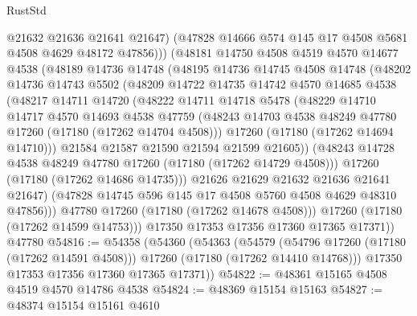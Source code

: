\begin{lexlean}{RustStd}
\begin{coremodule}
                @21632
                @21636
                @21641
                @21647)
              (@47828 @14666 @574 @145 @17 @4508 @5681 @4508 @4629 @48172 @47856)))
          (@48181
            @14750
            @4508
            @4519
            @4570
            @14677
            @4538
            (@48189
              @14736
              @14748
              (@48195
                @14736
                @14745
                @4508
                @14748
                (@48202
                  @14736
                  @14743
                  @5502
                  (@48209
                    @14722
                    @14735
                    @14742
                    @4570
                    @14685
                    @4538
                    (@48217
                      @14711
                      @14720
                      (@48222
                        @14711
                        @14718
                        @5478
                        (@48229
                          @14710
                          @14717
                          @4570
                          @14693
                          @4538
                          @47759
                          (@48243 @14703 @4538 @48249 @47780 @17260 (@17180 (@17262 @14704 @4508)))
                          @17260
                          (@17180 (@17262 @14694 @14710)))
                        @21584
                        @21587
                        @21590
                        @21594
                        @21599
                        @21605))
                    (@48243 @14728 @4538 @48249 @47780 @17260 (@17180 (@17262 @14729 @4508)))
                    @17260
                    (@17180 (@17262 @14686 @14735)))
                  @21626
                  @21629
                  @21632
                  @21636
                  @21641
                  @21647)
                (@47828 @14745 @596 @145 @17 @4508 @5760 @4508 @4629 @48310 @47856)))
            @47780
            @17260
            (@17180 (@17262 @14678 @4508)))
          @17260
          (@17180 (@17262 @14599 @14753)))
        @17350
        @17353
        @17356
        @17360
        @17365
        @17371))
    @47780
@54816 := @54358
    (@54360
      (@54363
        (@54579
          (@54796 @17260 (@17180 (@17262 @14591 @4508)))
          @17260
          (@17180 (@17262 @14410 @14768)))
        @17350
        @17353
        @17356
        @17360
        @17365
        @17371))
@54822 := @48361 @15165 @4508 @4519 @4570 @14786 @4538
@54824 := @48369 @15154 @15163
@54827 := @48374 @15154 @15161 @4610

\end{coremodule}
\end{lexlean}
